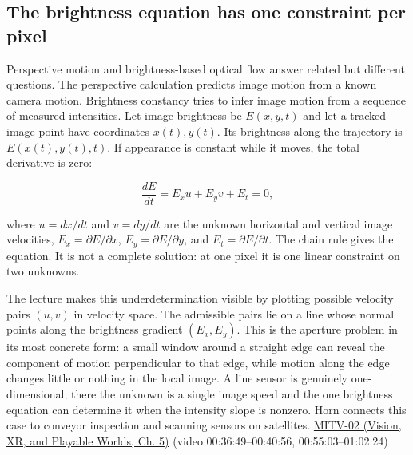 \subsection{The brightness equation has one constraint per pixel}\label{04-visual-computing-ii-ch030-the-brightness-equation-has-one-constraint-per-pixel}

\hypertarget{04-visual-computing-ii-ch030-the-brightness-equation-has-one-constraint-per-pixel}{}

Perspective motion and brightness-based optical flow answer related but different questions. The perspective calculation predicts image motion from a known camera motion. Brightness constancy tries to infer image motion from a sequence of measured intensities. Let image brightness be \(E(x,y,t)\) and let a tracked image point have coordinates \(x(t),y(t)\). Its brightness along the trajectory is \(E(x(t),y(t),t)\). If appearance is constant while it moves, the total derivative is zero:

\[
\frac{dE}{dt}=E_x u+E_y v+E_t=0,
\]

where \(u=dx/dt\) and \(v=dy/dt\) are the unknown horizontal and vertical image velocities, \(E_x=\partial E/\partial x\), \(E_y=\partial E/\partial y\), and \(E_t=\partial E/\partial t\). The chain rule gives the equation. It is not a complete solution: at one pixel it is one linear constraint on two unknowns.

The lecture makes this underdetermination visible by plotting possible velocity pairs \((u,v)\) in velocity space. The admissible pairs lie on a line whose normal points along the brightness gradient \((E_x,E_y)\). This is the aperture problem in its most concrete form: a small window around a straight edge can reveal the component of motion perpendicular to that edge, while motion along the edge changes little or nothing in the local image. A line sensor is genuinely one-dimensional; there the unknown is a single image speed and the one brightness equation can determine it when the intensity slope is nonzero. Horn connects this case to conveyor inspection and scanning sensors on satellites. \href{../07-Vision-XR-and-Playable-Worlds/main.pdf\#nameddest=04-visual-computing-ii-ch036-mitv-02---image-formation-perspective-projection-time-derivative-motion-field}{MITV-02 (Vision, XR, and Playable Worlds, Ch. 5)} (video 00:36:49--00:40:56, 00:55:03--01:02:24)


